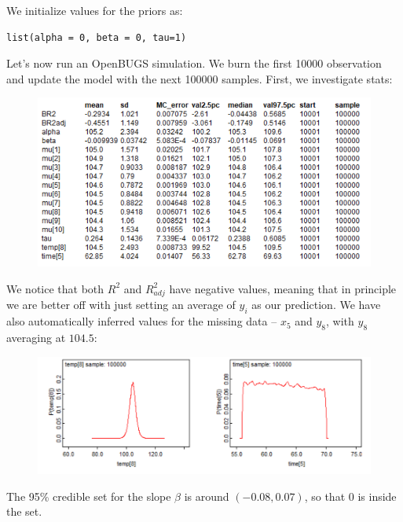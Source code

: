 \documentclass[a4 paper]{article}
\begin{document}
We initialize values for the priors as:
\begin{Verbatim}
list(alpha = 0, beta = 0, tau=1) 
\end{Verbatim} 



Let's now run an OpenBUGS simulation. We burn
the first 10000 observation and update the model 
with the next 100000 samples. First, we 
investigate stats:

\begin{figure}[H]
	\includegraphics[scale=1.0]{q1}
	\centering
	\label{q1}
\end{figure}


We notice that both $R^2$ and $R^2_{adj}$
have negative values, meaning that in principle
we are better off with just setting an average 
of $y_i$ as our prediction. We have also 
automatically inferred values for the 
missing data -- $x_5$ and $y_8$, 
with $y_8$ averaging at $104.5$: 

\begin{figure}[H]
	\includegraphics[scale=1.0]{q1_2}
	\centering
	\label{q1_2}
\end{figure}


The 95\% credible set for the slope 
$\beta$ is around $(-0.08, 0.07)$, so that
 $0$ is inside the set. \\
\end{document}
